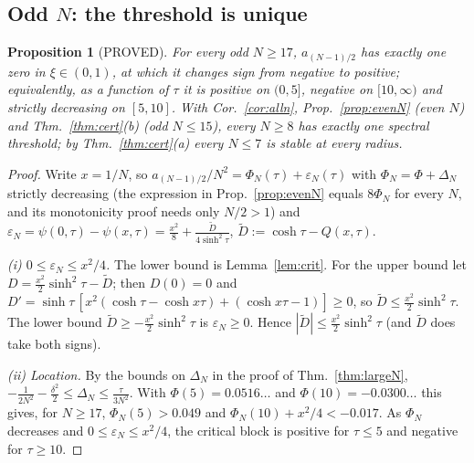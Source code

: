 \documentclass[11pt]{article}
\newtheorem{proposition}[theorem]{Proposition}
\theoremstyle{remark}
\begin{document}
\subsection*{Odd $N$: the threshold is unique}
\begin{proposition}[PROVED]\label{prop:oddN}
For every odd $N\ge17$, $a_{(N-1)/2}$ has exactly one zero in $\xi\in(0,1)$, at which it changes sign from negative to
positive; equivalently, as a function of $\tau$ it is positive on $(0,5]$, negative on $[10,\infty)$ and strictly
decreasing on $[5,10]$. With Cor.~\ref{cor:alln}, Prop.~\ref{prop:evenN} (even $N$) and Thm.~\ref{thm:cert}(b) (odd
$N\le15$), every $N\ge8$ has exactly one spectral threshold; by Thm.~\ref{thm:cert}(a) every $N\le7$ is stable at every
radius.
\end{proposition}
\begin{proof}
Write $x=1/N$, so $a_{(N-1)/2}/N^2=\Phi_N(\tau)+\varepsilon_N(\tau)$ with $\Phi_N=\Phi+\Delta_N$ strictly decreasing
(the expression in Prop.~\ref{prop:evenN} equals $8\Phi_N$ for every $N$, and its monotonicity proof needs only
$N/2>1$) and $\varepsilon_N=\psi(0,\tau)-\psi(x,\tau)=\frac{x^2}8+\frac{\tilde D}{4\sinh^2\tau}$,
$\tilde D:=\cosh\tau-Q(x,\tau)$.

\emph{(i) $0\le\varepsilon_N\le x^2/4$.} The lower bound is Lemma~\ref{lem:crit}. For the upper bound let
$D=\frac{x^2}2\sinh^2\tau-\tilde D$; then $D(0)=0$ and
$D'=\sinh\tau\,[x^2(\cosh\tau-\cosh x\tau)+(\cosh x\tau-1)]\ge0$, so $\tilde D\le\frac{x^2}2\sinh^2\tau$. The lower bound
$\tilde D\ge-\frac{x^2}2\sinh^2\tau$ is $\varepsilon_N\ge0$. Hence $|\tilde D|\le\frac{x^2}2\sinh^2\tau$ (and $\tilde D$ does take both
signs).

\emph{(ii) Location.} By the bounds on $\Delta_N$ in the proof of Thm.~\ref{thm:largeN},
$-\frac1{2N^2}-\frac{\delta^2}2\le\Delta_N\le\frac\tau{3N^2}$. With $\Phi(5)=0.0516\ldots$ and $\Phi(10)=-0.0300\ldots$ this gives,
for $N\ge17$, $\Phi_N(5)>0.049$ and $\Phi_N(10)+x^2/4<-0.017$. As $\Phi_N$ decreases and $0\le\varepsilon_N\le x^2/4$, the
critical block is positive for $\tau\le5$ and negative for $\tau\ge10$.


\end{proof}
\end{document}

